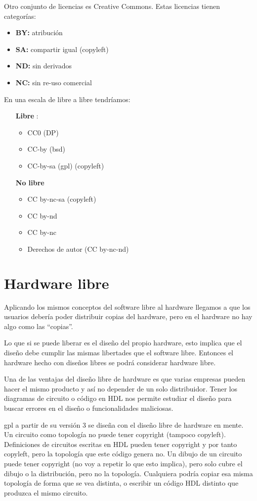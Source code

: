 Otro conjunto de licencias es Creative Commons. Estas licencias tienen categorías:
\begin{itemize}
    \item\textbf{BY:} atribución
    \item\textbf{SA:} compartir igual (copyleft)
    \item\textbf{ND:} sin derivados
    \item\textbf{NC:} sin re-uso comercial
\end{itemize}

En una escala de libre a libre tendríamos:
\begin{itemize}
    \item[\textbf{Libre}]:
    \begin{itemize}
        \item CC0 (DP)
        \item CC-by (\gls{bsd})
        \item CC-by-sa (\gls{gpl}) (copyleft)
    \end{itemize}
    \item[\textbf{No libre}]
        \begin{itemize}
            \item CC by-nc-sa (copyleft)
            \item CC by-nd
            \item CC by-nc
            \item Derechos de autor (CC by-nc-nd)
        \end{itemize}
\end{itemize}


\section{Hardware libre}

Aplicando los mismos conceptos del software libre al hardware llegamos a que los usuarios debería poder distribuir copias del hardware, pero en el hardware no hay algo como las ``copias''.

Lo que si se puede liberar es el diseño del propio hardware, esto implica que el diseño debe cumplir las mismas libertades que el software libre. Entonces el hardware hecho con diseños libres se podrá considerar hardware libre.

Una de las ventajas del diseño libre de hardware es que varias empresas pueden hacer el mismo producto y así no depender de un solo distribuidor. Tener los diagramas de circuito o código en HDL nos permite estudiar el diseño para buscar errores en el diseño o funcionalidades maliciosas.

\gls{gpl} a partir de su versión 3 se diseña con el diseño libre de hardware en mente. Un circuito como topología no puede tener copyright (tampoco copyleft). Definiciones de circuitos escritas en HDL pueden tener copyright y por tanto copyleft, pero la topología que este código genera no.
Un dibujo de un circuito puede tener copyright (no voy a repetir lo que esto implica), pero solo cubre el dibujo o la distribución, pero no la topología. Cualquiera podría copiar esa misma topología de forma que se vea distinta, o escribir un código HDL distinto que produzca el mismo circuito.
